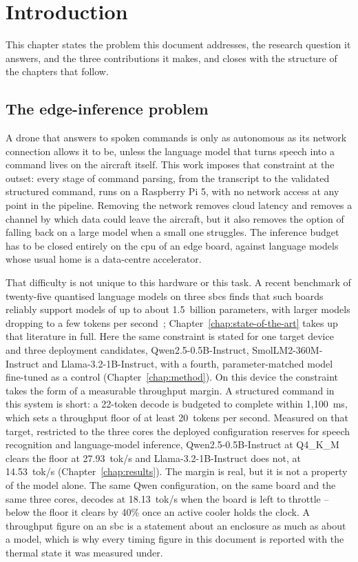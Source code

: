 \chapter{Introduction}
\label{chap:introduction}

This chapter states the problem this document addresses, the research question it answers, and
the three contributions it makes, and closes with the structure of the chapters that follow.

\section{The edge-inference problem}
\enlargethispage{\baselineskip}
A drone that answers to spoken commands is only as autonomous as its network connection allows it
to be, unless the language model that turns speech into a command lives on the aircraft itself.
This work imposes that constraint at the outset: every stage of command parsing, from the
transcript to the validated structured command, runs on a Raspberry Pi 5, with no network access
at any point in the pipeline. Removing the network removes cloud latency and removes a channel by
which data could leave the aircraft, but it also removes the option of falling back on a large
model when a small one struggles. The inference budget has to be closed entirely on the
\gls{cpu} of an edge board, against language models whose usual home is a data-centre
accelerator.

That difficulty is not unique to this hardware or this task. A recent benchmark of twenty-five
quantised language models on three \glspl{sbc} finds that such boards reliably support models
of up to about 1.5~billion parameters, with larger models dropping to a few tokens per
second~\cite{sbc2025}; Chapter~\ref{chap:state-of-the-art} takes up that literature in full. Here the
same constraint is stated for one target device and three deployment candidates,
Qwen2.5-0.5B-Instruct, SmolLM2-360M-Instruct and Llama-3.2-1B-Instruct, with a fourth,
parameter-matched model fine-tuned as a control (Chapter~\ref{chap:method}). On this device the
constraint takes the form of a measurable throughput margin. A structured command in this system
is short: a 22-token decode is budgeted to complete within 1{,}100~ms, which sets a throughput
floor of at least 20~tokens per second.
Measured on that target, restricted to the three cores the deployed configuration reserves for
speech recognition and language-model inference, Qwen2.5-0.5B-Instruct at Q4\_K\_M clears the
floor at 27.93~tok/s and Llama-3.2-1B-Instruct does not, at 14.53~tok/s
(Chapter~\ref{chap:results}). The margin is real, but it is not a property of the model alone.
The same Qwen configuration, on the same board and the same three cores, decodes at 18.13~tok/s
when the board is left to throttle -- below the floor it clears by 40\% once an active cooler
holds the clock. A throughput figure on an \gls{sbc} is a statement about an enclosure as much as
about a model, which is why every timing figure in this document is reported with the thermal
state it was measured under.

